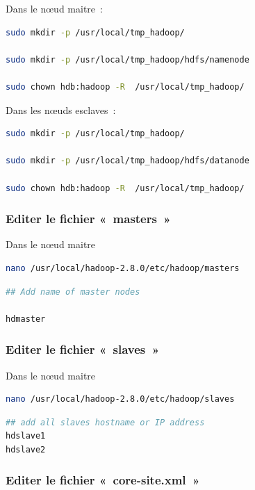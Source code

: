 \documentclass[12pt,french]{book}
\begin{document}
Dans le nœud maitre :

\begin{lstlisting}[language=bash, frame=single]
sudo mkdir -p /usr/local/tmp_hadoop/

sudo mkdir -p /usr/local/tmp_hadoop/hdfs/namenode

sudo chown hdb:hadoop -R  /usr/local/tmp_hadoop/
\end{lstlisting}

Dans les nœuds esclaves :

\begin{lstlisting}[language=bash, frame=single]
sudo mkdir -p /usr/local/tmp_hadoop/

sudo mkdir -p /usr/local/tmp_hadoop/hdfs/datanode

sudo chown hdb:hadoop -R  /usr/local/tmp_hadoop/
\end{lstlisting}

\subsubsection{Editer le fichier « masters »}

Dans le nœud maitre

\begin{lstlisting}[language=bash, frame=single]
nano /usr/local/hadoop-2.8.0/etc/hadoop/masters 
\end{lstlisting}


\begin{lstlisting}[language=bash, frame=single]
## Add name of master nodes

hdmaster
\end{lstlisting}

\subsubsection{Editer le fichier « slaves »}

Dans le nœud maitre


\begin{lstlisting}[language=bash, frame=single]
nano /usr/local/hadoop-2.8.0/etc/hadoop/slaves 
\end{lstlisting}

\begin{lstlisting}[language=bash, frame=single]
## add all slaves hostname or IP address
hdslave1
hdslave2
\end{lstlisting}

\subsubsection{Editer le fichier « core-site.xml »}
\end{document}
